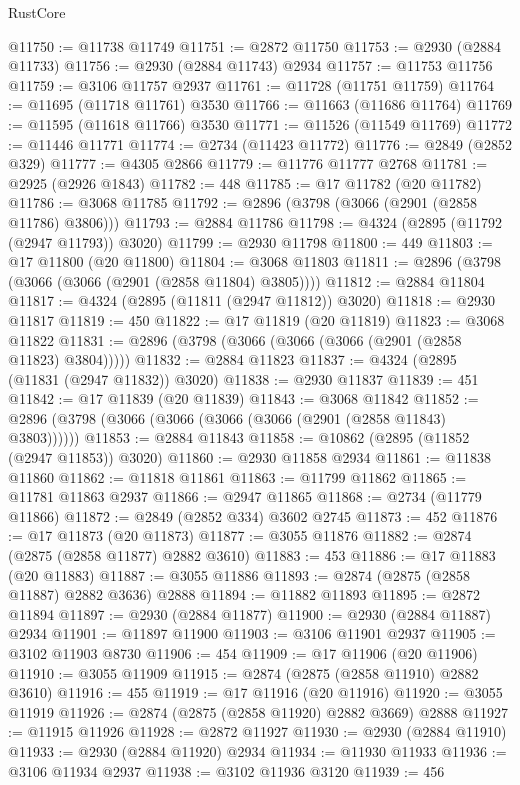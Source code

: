 \begin{lexlean}{RustCore}
\begin{coremodule}
@11750 := @11738 @11749
@11751 := @2872 @11750
@11753 := @2930 (@2884 @11733)
@11756 := @2930 (@2884 @11743) @2934
@11757 := @11753 @11756
@11759 := @3106 @11757 @2937
@11761 := @11728 (@11751 @11759)
@11764 := @11695 (@11718 @11761) @3530
@11766 := @11663 (@11686 @11764)
@11769 := @11595 (@11618 @11766) @3530
@11771 := @11526 (@11549 @11769)
@11772 := @11446 @11771
@11774 := @2734 (@11423 @11772)
@11776 := @2849 (@2852 @329)
@11777 := @4305 @2866
@11779 := @11776 @11777 @2768
@11781 := @2925 (@2926 @1843)
@11782 := 448
@11785 := @17 @11782 (@20 @11782)
@11786 := @3068 @11785
@11792 := @2896 (@3798 (@3066 (@2901 (@2858 @11786) @3806)))
@11793 := @2884 @11786
@11798 := @4324 (@2895 (@11792 (@2947 @11793)) @3020)
@11799 := @2930 @11798
@11800 := 449
@11803 := @17 @11800 (@20 @11800)
@11804 := @3068 @11803
@11811 := @2896 (@3798 (@3066 (@3066 (@2901 (@2858 @11804) @3805))))
@11812 := @2884 @11804
@11817 := @4324 (@2895 (@11811 (@2947 @11812)) @3020)
@11818 := @2930 @11817
@11819 := 450
@11822 := @17 @11819 (@20 @11819)
@11823 := @3068 @11822
@11831 := @2896 (@3798 (@3066 (@3066 (@3066 (@2901 (@2858 @11823) @3804)))))
@11832 := @2884 @11823
@11837 := @4324 (@2895 (@11831 (@2947 @11832)) @3020)
@11838 := @2930 @11837
@11839 := 451
@11842 := @17 @11839 (@20 @11839)
@11843 := @3068 @11842
@11852 := @2896 (@3798 (@3066 (@3066 (@3066 (@3066 (@2901 (@2858 @11843) @3803))))))
@11853 := @2884 @11843
@11858 := @10862 (@2895 (@11852 (@2947 @11853)) @3020)
@11860 := @2930 @11858 @2934
@11861 := @11838 @11860
@11862 := @11818 @11861
@11863 := @11799 @11862
@11865 := @11781 @11863 @2937
@11866 := @2947 @11865
@11868 := @2734 (@11779 @11866)
@11872 := @2849 (@2852 @334) @3602 @2745
@11873 := 452
@11876 := @17 @11873 (@20 @11873)
@11877 := @3055 @11876
@11882 := @2874 (@2875 (@2858 @11877) @2882 @3610)
@11883 := 453
@11886 := @17 @11883 (@20 @11883)
@11887 := @3055 @11886
@11893 := @2874 (@2875 (@2858 @11887) @2882 @3636) @2888
@11894 := @11882 @11893
@11895 := @2872 @11894
@11897 := @2930 (@2884 @11877)
@11900 := @2930 (@2884 @11887) @2934
@11901 := @11897 @11900
@11903 := @3106 @11901 @2937
@11905 := @3102 @11903 @8730
@11906 := 454
@11909 := @17 @11906 (@20 @11906)
@11910 := @3055 @11909
@11915 := @2874 (@2875 (@2858 @11910) @2882 @3610)
@11916 := 455
@11919 := @17 @11916 (@20 @11916)
@11920 := @3055 @11919
@11926 := @2874 (@2875 (@2858 @11920) @2882 @3669) @2888
@11927 := @11915 @11926
@11928 := @2872 @11927
@11930 := @2930 (@2884 @11910)
@11933 := @2930 (@2884 @11920) @2934
@11934 := @11930 @11933
@11936 := @3106 @11934 @2937
@11938 := @3102 @11936 @3120
@11939 := 456

\end{coremodule}
\end{lexlean}
